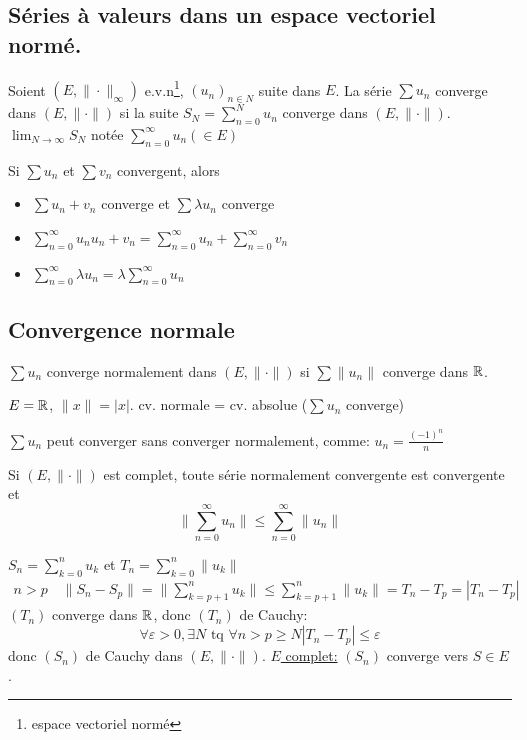 \subsection{Séries à valeurs dans un espace vectoriel normé.}
\begin{definition}
     Soient $(E, \| \cdot \|_{\infty})$ e.v.n\footnote{espace vectoriel normé}, $(u_n)_{n \in N}$ suite dans $E$. La série  $\sum u_n$ converge dans  $(E, \| \cdot \|)$ si la suite $S_N = \sum_{n=0}^{N} u_n$ converge dans $(E, \| \cdot \|)$. $\lim_{N \to \infty} S_N$ notée $\sum_{n=0}^{\infty} u_n (\in E)$
\end{definition}
\begin{remark}
   Si $\sum u_n$ et  $\sum v_n$ convergent, alors  
   \begin{itemize}
       \item $\sum u_n + v_n$ converge et  $\sum \lambda u_n$ converge
       \item 
           $\sum_{n=0}^{\infty} u_n u_n + v_n = \sum_{n=0}^{\infty} u_n + \sum_{n=0}^{\infty} v_n$ 
       \item $\sum_{n=0}^{\infty} \lambda u_n = \lambda \sum_{n=0}^{\infty} u_n$
   \end{itemize}
\end{remark}

\subsection{Convergence normale}
\begin{definition}
   $\sum u_n$ converge normalement dans  $(E, \| \cdot \|)$ si  $\sum \|u_n\|$ converge dans  $\mathbb{R}$. 
\end{definition}
\begin{eg}
   $E = \mathbb{R}$, $\|x\| = |x|$. cv. normale = cv. absolue ($\sum u_n$ converge) 
\end{eg}
\begin{eg}
   $\sum u_n$ peut converger sans converger normalement, comme:  $u_n = \frac{(-1)^n}{n}$ 
\end{eg}

\begin{theorem}
    Si $(E, \| \cdot \|)$ est complet, toute série normalement convergente est convergente et 
     \[
    \|\sum_{n=0}^{\infty} u_n\| \le \sum_{n=0}^{\infty} \|u_n\|
    \] 
\end{theorem}
\begin{preuve}
   $S_n = \sum_{k=0}^{n} u_k$ et $T_n = \sum_{k=0}^{n} \|u_k\|$ 
   \begin{align*}
       n > p \quad \|S_n - S_p\| = \|\sum_{k = p+1}^{n} u_k\| \le \sum_{k=p+1}^{n} \|u_k\| = T_n - T_p = |T_n - T_p|
   \end{align*}
    $(T_n)$ converge dans  $\mathbb{R}$, donc $(T_n)$ de Cauchy:
     \[
    \forall \varepsilon > 0, \exists N \text{ tq } \forall n > p \ge N |T_n - T_p| \le \varepsilon
    \] 
    donc $(S_n)$ de Cauchy dans  $(E, \| \cdot \|)$.  \underline{$E$ complet:}  $(S_n)$ converge vers  $S \in E$.
\end{preuve}
